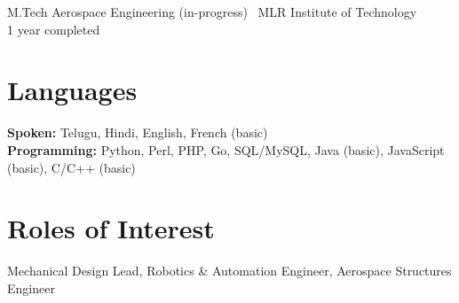\documentclass[11pt,a4paper]{article}
\begin{document}
M.Tech Aerospace Engineering (in-progress) \textemdash\ MLR Institute of Technology \\ \textcolor{muted}{1 year completed}

\section*{Languages}
\textbf{Spoken:} Telugu, Hindi, English, French (basic) \\
\textbf{Programming:} Python, Perl, PHP, Go, SQL/MySQL, Java (basic), JavaScript (basic), C/C++ (basic)

\section*{Roles of Interest}
Mechanical Design Lead, Robotics \& Automation Engineer, Aerospace Structures Engineer
\end{document}
